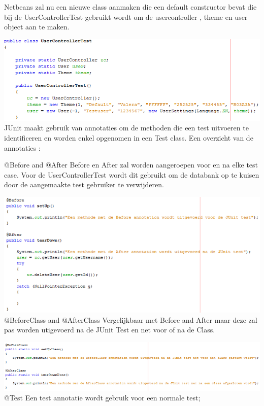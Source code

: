 \documentclass[pdftex,a4paper,12pt,twoside]{report}
\begin{document}
Netbeans zal nu een nieuwe class aanmaken die een default constructor bevat die bij de UserControllerTest gebruikt wordt om de usercontroller , theme en user object aan te maken.

\includegraphics{images/junit1.png}\\

JUnit maakt gebruik van annotaties om de methoden die een test uitvoeren te identificeren en worden enkel opgenomen in een Test class. 
Een overzicht van de annotaties :

@Before and @After
Before en After zal worden aangeroepen voor en na elke test case.
Voor de UserControllerTest wordt dit gebruikt om de databank op te kuisen door de aangemaakte test gebruiker te verwijderen.

\includegraphics{images/beforeafter.png}\\


@BeforeClass and @AfterClass
Vergelijkbaar met Before and After maar deze zal pas worden utigevoerd na de JUnit Test en net voor of na de Class.

\includegraphics{images/beforeafterclass.png}\\

@Test
Een test annotatie wordt gebruik voor een normale test;
\end{document}
